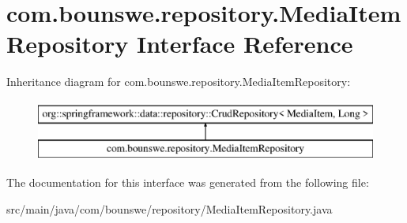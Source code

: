 \hypertarget{interfacecom_1_1bounswe_1_1repository_1_1_media_item_repository}{}\section{com.\+bounswe.\+repository.\+Media\+Item\+Repository Interface Reference}
\label{interfacecom_1_1bounswe_1_1repository_1_1_media_item_repository}
Inheritance diagram for com.\+bounswe.\+repository.\+Media\+Item\+Repository\+:\begin{figure}[H]
\begin{center}
\leavevmode
\includegraphics[height=2.000000cm]{interfacecom_1_1bounswe_1_1repository_1_1_media_item_repository}
\end{center}
\end{figure}


The documentation for this interface was generated from the following file\+:\begin{DoxyCompactItemize}
\item 
src/main/java/com/bounswe/repository/Media\+Item\+Repository.\+java\end{DoxyCompactItemize}
